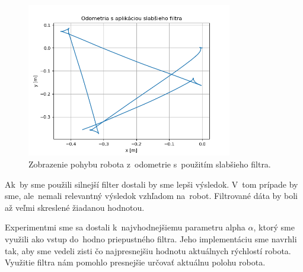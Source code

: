 \begin{figure}[!htbp]
	\begin{center}
		\includegraphics[width=0.8\textwidth]{img/stvorec_so_slabym_filtrom.png}
	\end{center}
	\caption{Zobrazenie pohybu robota z~odometrie s~použitím slabšieho filtra.}
	\label{fig:stvorecSoSlabsimFiltrom}
\end{figure}

Ak~by sme použili silnejší filter dostali by sme lepši výsledok. V~tom prípade by sme, ale~nemali relevantný výsledok
vzhľadom na~robot. Filtrované dáta by boli až veľmi skreslené žiadanou hodnotou.

Experimentmi sme sa dostali k~najvhodnejšiemu parametru alpha $\alpha$, ktorý sme využili ako vstup
do~hodno priepustného filtra. Jeho implementáciu sme navrhli tak, aby sme vedeli zisti čo najpresnejšiu
hodnotu aktuálnych rýchlostí robota. Využitie filtra nám pomohlo presnejšie určovať aktuálnu polohu robota.


